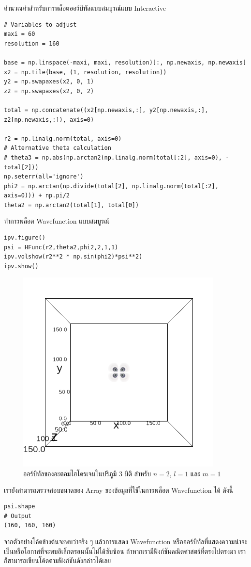 \noindent คำนวณค่าสำหรับการพล็อตออร์บิทัลแบบสมบูรณ์แบบ Interactive

\begin{lstlisting}[style=MyPython]
# Variables to adjust
maxi = 60
resolution = 160

base = np.linspace(-maxi, maxi, resolution)[:, np.newaxis, np.newaxis]
x2 = np.tile(base, (1, resolution, resolution))
y2 = np.swapaxes(x2, 0, 1)
z2 = np.swapaxes(x2, 0, 2)

total = np.concatenate((x2[np.newaxis,:], y2[np.newaxis,:], z2[np.newaxis,:]), axis=0)

r2 = np.linalg.norm(total, axis=0)
# Alternative theta calculation
# theta3 = np.abs(np.arctan2(np.linalg.norm(total[:2], axis=0), -total[2]))
np.seterr(all='ignore')
phi2 = np.arctan(np.divide(total[2], np.linalg.norm(total[:2], axis=0))) + np.pi/2
theta2 = np.arctan2(total[1], total[0])
\end{lstlisting}

\noindent ทำการพล็อต Wavefunction แบบสมบูรณ์

\begin{lstlisting}[style=MyPython]
ipv.figure()
psi = HFunc(r2,theta2,phi2,2,1,1)
ipv.volshow(r2**2 * np.sin(phi2)*psi**2)
ipv.show()
\end{lstlisting}

\begin{figure}[H]
    \centering
    \includegraphics[width=0.8\linewidth]{fig/wfn_hydro_3d_n2_l1_m1.png}
    \caption{ออร์บิทัลของอะตอมไฮโดรเจนในปริภูมิ 3 มิติ สำหรับ $n = 2$, $l = 1$ และ $m = 1$}
    \label{fig:wfn_hydro_3d_n2_l1_m1}
\end{figure}

\noindent เรายังสามารถตรวจสอบขนาดของ Array ของข้อมูลที่ใช้ในการพล็อต Wavefunction ได้ ดังนี้

\begin{lstlisting}[style=MyPython]
psi.shape
# Output
(160, 160, 160)
\end{lstlisting}

\bigskip

จากตัวอย่างโค้ดข้างต้นจะพบว่าจริง ๆ แล้วการแสดง Wavefunction หรือออร์บิทัลที่แสดงความน่าจะเป็นหรือโอกาสที่จะพบอิเล็กตรอนนั้นไม่ได้ซับซ้อน 
ถ้าหากเรามีฟังก์ชันคณิตศาสตร์ที่ตรงไปตรงมา เราก็สามารถเขียนโค้ดตามฟังก์ชันดังกล่าวได้เลย

